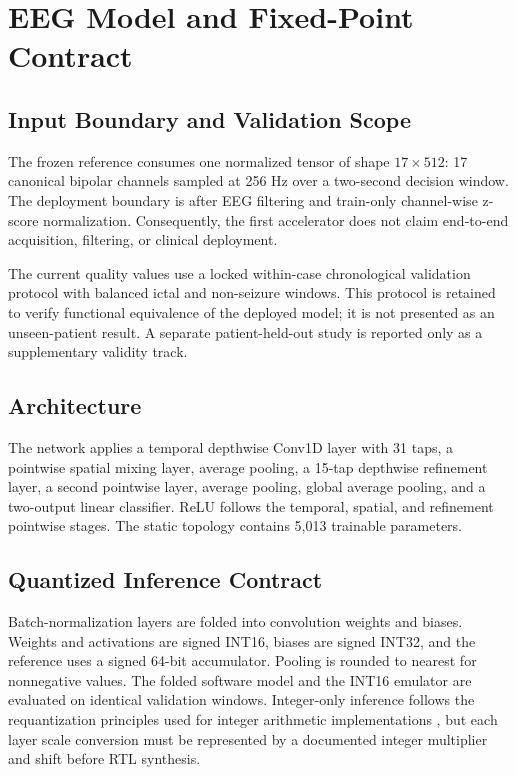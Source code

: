 \section{EEG Model and Fixed-Point Contract}

\subsection{Input Boundary and Validation Scope}

The frozen reference consumes one normalized tensor of shape $17 \times 512$:
17 canonical bipolar channels sampled at 256 Hz over a two-second decision
window. The deployment boundary is after EEG filtering and train-only
channel-wise z-score normalization. Consequently, the first accelerator does
not claim end-to-end acquisition, filtering, or clinical deployment.

The current quality values use a locked within-case chronological validation
protocol with balanced ictal and non-seizure windows. This protocol is retained
to verify functional equivalence of the deployed model; it is not presented as
an unseen-patient result. A separate patient-held-out study is reported only as
a supplementary validity track.

\subsection{\episepset{} Architecture}

The network applies a temporal depthwise Conv1D layer with 31 taps, a pointwise
spatial mixing layer, average pooling, a 15-tap depthwise refinement layer, a
second pointwise layer, average pooling, global average pooling, and a
two-output linear classifier. ReLU follows the temporal, spatial, and refinement
pointwise stages. The static topology contains 5,013 trainable parameters.

\subsection{Quantized Inference Contract}

Batch-normalization layers are folded into convolution weights and biases.
Weights and activations are signed INT16, biases are signed INT32, and the
reference uses a signed 64-bit accumulator. Pooling is rounded to nearest for
nonnegative values. The folded software model and the INT16 emulator are
evaluated on identical validation windows. Integer-only inference follows the
requantization principles used for integer arithmetic implementations
\cite{jacob2018}, but each layer scale conversion must be represented by a
documented integer multiplier and shift before RTL synthesis.


